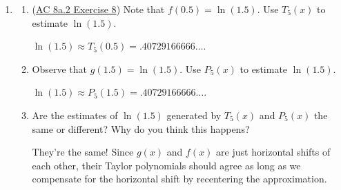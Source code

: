 \begin{enumerate}[leftmargin=0pt]
\begin{enumerate}
    \begin{red}
    $\sin(x) \approx 1 
    - \frac{1}{2!} \left(x-\frac\pi2\right)^2
    + \frac{1}{4!} \left(x-\frac\pi2\right)^4
    - \frac{1}{6!} \left(x-\frac\pi2\right)^6
    $.
    \end{red}
    \item How is your result in (a) similar to the degree 6 Taylor polynomial of $\cos(x)$ that is centered at $a=0$?
    
    \begin{red}
    Well hey, it's totally the same, except all of the $x$'s have been replaced by $\left(x-\frac{\pi}{2}\right)$'s.
    \end{red}
    \item Recall the trigonometric identity that states $\sin(x) = \cos(x-\tfrac\pi2)$. How does this identity help you explain what you found in (a) and (b)?
    
    \begin{red}
    This is actually a perfect description of what has happened: we took the thing we got for $\cos(x)$ and just replaced $x$ by $(x-\tfrac\pi2)$, and according to this trigonometric identity, that gives us the values of $\sin(x)$.
    \end{red}
    \end{enumerate}

\item 

\begin{enumerate}
    \item (\href{https://faculty.gvsu.edu/boelkinm/Home/ACS/sec-8a-2-taylor-poly.html#ez-8a-2-3}{AC 8a.2 Exercise 8}) Note that $f(0.5) = \ln(1.5)$. Use $T_5(x)$ to estimate $\ln(1.5)$.
    
    \begin{red} $\ln(1.5) \approx T_5(0.5) = .40729166666\ldots$.
    \end{red}
    
    \item Observe that $g(1.5) = \ln(1.5)$. Use $P_5(x)$ to estimate $\ln(1.5)$.
    
    \begin{red}$\ln(1.5) \approx P_5(1.5) = .40729166666\ldots$.
    \end{red}
    
    \item Are the estimates of $\ln(1.5)$ generated by $T_5(x)$ and $P_5(x)$ the same or different? Why do you think this happens?
    
    \begin{red}
    They're the same! Since $g(x)$ and $f(x)$ are just horizontal shifts of each other, their Taylor polynomials should agree as long as we compensate for the horizontal shift by recentering the approximation.
    \end{red}
\end{enumerate}

\end{enumerate}
